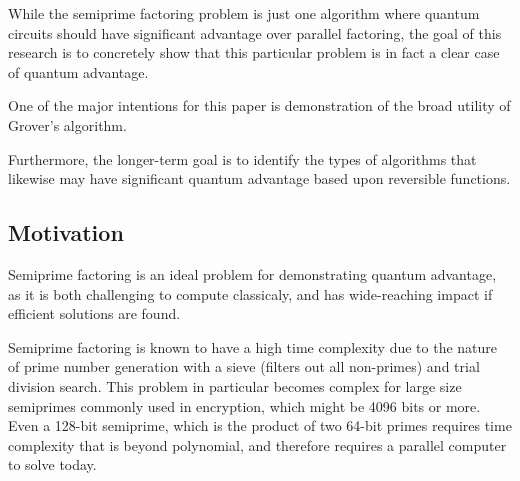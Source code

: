 \documentclass[twocolumn]{cinc}
\begin{document}
  While the semiprime factoring problem is just one algorithm where quantum circuits 
  should have significant advantage over parallel factoring, 
  the goal of this research is to concretely show that this particular problem is 
  in fact a clear case of quantum advantage.

  One of the major intentions for this paper is demonstration of the broad utility of Grover's 
  algorithm.%

  Furthermore, the longer-term goal is to identify the types of algorithms that 
  likewise may have significant quantum advantage based upon reversible functions.

  \subsection{Motivation}

  Semiprime factoring is an ideal problem for demonstrating quantum advantage,
  as it is both challenging to compute classicaly, and has wide-reaching
  impact if efficient solutions are found.

  Semiprime factoring is known to have a high time complexity due to the nature of
  prime number generation with a sieve (filters out all non-primes) and trial division search.
  This problem in particular becomes complex for large size semiprimes commonly used in 
  encryption, which might be 4096 bits or more. 
  Even a 128-bit semiprime, which is the product of two 64-bit primes requires time complexity
  that is beyond polynomial, and therefore requires a parallel computer to solve today. 
\end{document}
